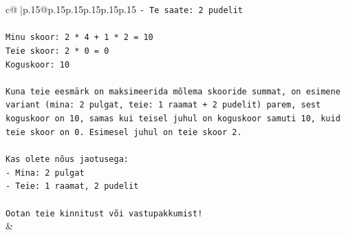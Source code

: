 \documentclass{article}
\begin{document}
{\begin{supertabular}{c@{$\;$}|p{.15\linewidth}@{}p{.15\linewidth}p{.15\linewidth}p{.15\linewidth}p{.15\linewidth}p{.15\linewidth}}
{{{\texttt{{-} Te saate: 2 pudelit} \\
\\ 
\texttt{Minu skoor: 2 * 4 + 1 * 2 = 10} \\
\texttt{Teie skoor: 2 * 0 = 0} \\
\texttt{Koguskoor: 10} \\
\\ 
\texttt{Kuna teie eesmärk on maksimeerida mõlema skooride summat, on esimene variant (mina: 2 pulgat, teie: 1 raamat + 2 pudelit) parem, sest koguskoor on 10, samas kui teisel juhul on koguskoor samuti 10, kuid teie skoor on 0. Esimesel juhul on teie skoor 2.} \\
\\ 
\texttt{Kas olete nõus jaotusega:} \\
\texttt{{-} Mina: 2 pulgat} \\
\texttt{{-} Teie: 1 raamat, 2 pudelit} \\
\\ 
\texttt{Ootan teie kinnitust või vastupakkumist!} \\
            }
        }
    }
    & \\ \\


\end{supertabular}}
\end{document}
